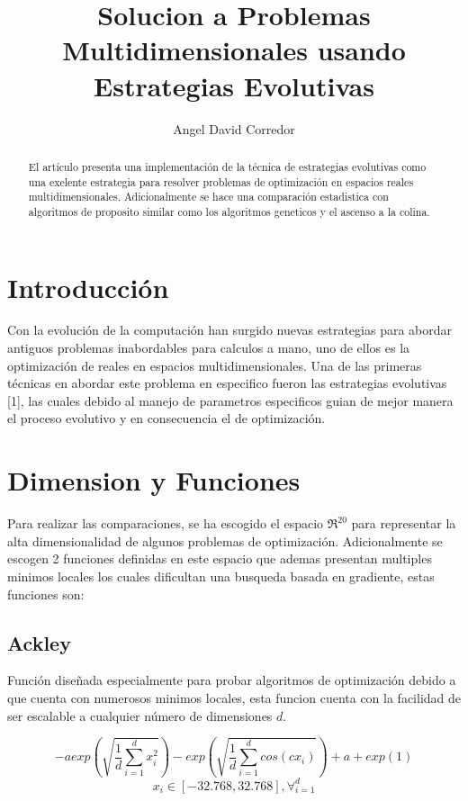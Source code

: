 \documentclass[twocolumn]{IEEEtran}
\begin{document}
\title{Solucion a Problemas Multidimensionales usando Estrategias Evolutivas}
\author{Angel David Corredor}
\date{}
\maketitle

\begin{abstract}
    El artículo presenta una implementación de la técnica de estrategias evolutivas
    como una exelente estrategia para resolver problemas de optimización en espacios
    reales multidimensionales. Adicionalmente se hace una comparación estadistica con
    algoritmos de proposito similar como los algoritmos geneticos y el ascenso a la colina. 
\end{abstract}

\section{Introducción}

Con la evolución de la computación han surgido nuevas estrategias para abordar antiguos problemas
inabordables para calculos a mano, uno de ellos es la optimización de reales en espacios 
multidimensionales. Una de las primeras técnicas en abordar este problema en especifico fueron
las estrategias evolutivas [1],
las cuales debido al manejo de parametros especificos guian de mejor manera el proceso evolutivo
y en consecuencia el de optimización.

\section{Dimension y Funciones}

Para realizar las comparaciones, se ha escogido el espacio $\Re^{20}$ para representar la alta
dimensionalidad de algunos problemas de optimización. Adicionalmente se escogen 2 funciones 
definidas en este espacio que ademas presentan multiples minimos locales los cuales dificultan
una busqueda basada en gradiente, estas funciones son:

\subsection{Ackley}
Función diseñada especialmente para probar algoritmos de optimización debido a que cuenta con
numerosos minimos locales, esta funcion cuenta con la facilidad de ser escalable a cualquier 
número de dimensiones $d$.

$$
-a exp(\sqrt{\frac{1}{d} \sum_{i=1}^d{x_i^2}})
- exp(\sqrt{\frac{1}{d} \sum_{i=1}^d{cos(c x_i)}}) + a + exp(1)
$$
$$ x_i \in [-32.768, 32.768], \forall_{i=1}^d$$
\end{document}
